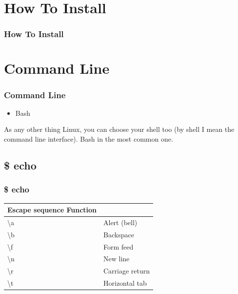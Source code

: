 \documentclass{beamer}
\begin{document}

\section{How To Install}
\begin{frame}
\frametitle{How To Install}

\end{frame}

\section{Command Line}
\begin{frame}
\frametitle{Command Line}
\begin{itemize}
\item Bash
\end{itemize}
As any other thing Linux, you can choose your shell too (by shell I mean the command line interface). Bash in the most common one.


\end{frame}

\subsection{\$ echo}
\begin{frame}
\frametitle{\$ echo}
 \par
\vspace{0.15cm}
 \par
\vspace{0.15cm}
\begin{table}
\begin{tabular}{l l}
\toprule
\textbf{Escape sequence Function} & \textbf{}\\
\midrule
\textbackslash a & Alert (bell) \\
\textbackslash b & Backspace \\
\textbackslash f & Form feed \\
\textbackslash n & New line \\
\textbackslash r & Carriage return \\
\textbackslash t & Horizontal tab \\
\bottomrule
\end{tabular}
\end{table}
\end{frame}
\end{document}

